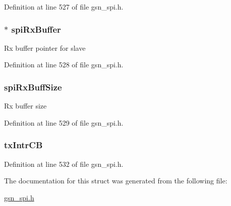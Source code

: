 Definition at line 527 of file gsn\_\-spi.h.

\hypertarget{a00231_aa07b66f7f4a73b04e5ffaf3f29b4b414}{
\subsubsection[{spiRxBuffer}]{$\ast$ {\bf spiRxBuffer}}}
\label{a00231_aa07b66f7f4a73b04e5ffaf3f29b4b414}
Rx buffer pointer for slave 

Definition at line 528 of file gsn\_\-spi.h.

\hypertarget{a00231_a0b720c9f52a6b5aa0634f432850766ec}{
\subsubsection[{spiRxBuffSize}]{ {\bf spiRxBuffSize}}}
\label{a00231_a0b720c9f52a6b5aa0634f432850766ec}
Rx buffer size 

Definition at line 529 of file gsn\_\-spi.h.

\hypertarget{a00231_a4e134bf841774583e84c1b9d14aa928b}{
\subsubsection[{txIntrCB}]{ {\bf txIntrCB}}}
\label{a00231_a4e134bf841774583e84c1b9d14aa928b}


Definition at line 532 of file gsn\_\-spi.h.



The documentation for this struct was generated from the following file:\begin{DoxyCompactItemize}
\item 
\hyperlink{a00587}{gsn\_\-spi.h}\end{DoxyCompactItemize}
